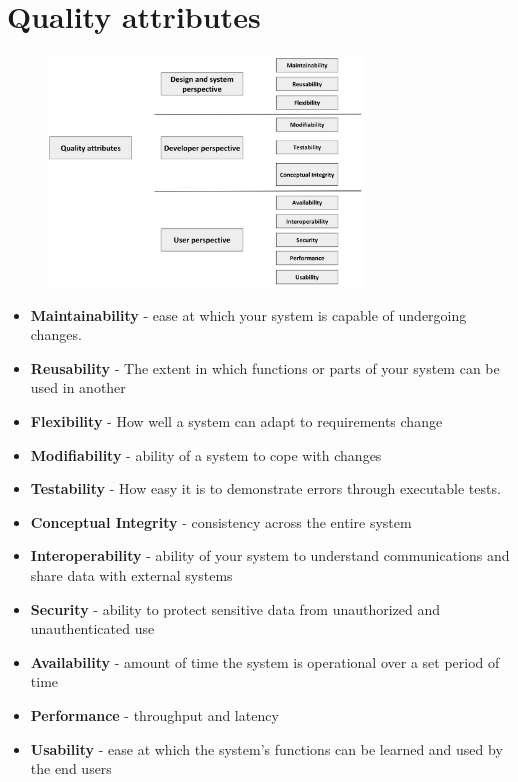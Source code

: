 \section{Quality attributes}
\begin{figure}[ht!]
\centering
\includegraphics[width=0.75\textwidth]{oborove/SWA/img/quality.png}
\end{figure}


\begin{itemize}
    \item \textbf{Maintainability} - ease at which your system is capable of undergoing changes.
    \item \textbf{Reusability} - The extent in which functions or parts of your system can be used in another
    \item \textbf{Flexibility} - How well a system can adapt to requirements change
    \item \textbf{Modifiability} - ability of a system to cope with changes
    \item \textbf{Testability} - How easy it is to demonstrate errors through executable tests.
    \item \textbf{Conceptual Integrity} - consistency across the entire system
    \item \textbf{Interoperability} - ability of your system to understand communications and share data with external systems
    \item \textbf{Security} - ability to protect sensitive data from unauthorized and unauthenticated use
    \item \textbf{Availability} - amount of time the system is operational over a set period of time
    \item \textbf{Performance} - throughput and latency
    \item \textbf{Usability} - ease at which the system’s functions can be learned and used by the end users
\end{itemize}

